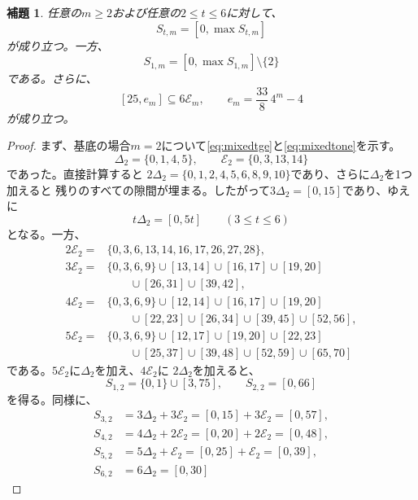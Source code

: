 \documentclass[12pt]{ltjsarticle}
\theoremstyle{plain}
\newtheorem{lemma}[theorem]{補題}
\begin{document}
\begin{lemma}\label{lem:mixed}
任意の$m\geq2$および任意の$2\leq t\leq6$に対して、
\begin{equation}\label{eq:mixedtge}
 S_{t,m}=[0,\max S_{t,m}]
\end{equation}
が成り立つ。一方、
\begin{equation}\label{eq:mixedtone}
 S_{1,m}=[0,\max S_{1,m}]\setminus\{2\}
\end{equation}
である。さらに、
\begin{equation}\label{eq:mixedEminterval}
 [25,e_m]\subseteq6\mathcal E_m,\qquad e_m=\frac{33}{8}\,4^m-4
\end{equation}
が成り立つ。
\end{lemma}

\begin{proof}
まず、基底の場合$m=2$について\eqref{eq:mixedtge}と\eqref{eq:mixedtone}を示す。
\[
 \Delta_2=\{0,1,4,5\},\qquad \mathcal E_2=\{0,3,13,14\}
\]
であった。直接計算すると
$2\Delta_2=\{0,1,2,4,5,6,8,9,10\}$であり、さらに$\Delta_2$を1つ加えると
残りのすべての隙間が埋まる。したがって$3\Delta_2=[0,15]$であり、ゆえに
\[
 t\Delta_2=[0,5t]\qquad(3\leq t\leq6)
\]
となる。一方、
\[
\begin{aligned}
2\mathcal E_2
={}&\{0,3,6,13,14,16,17,26,27,28\},\\[1ex]
3\mathcal E_2
={}&\{0,3,6,9\}\cup[13,14]\cup[16,17]\cup[19,20]\\
&\qquad\cup[26,31]\cup[39,42],\\[1ex]
4\mathcal E_2
={}&\{0,3,6,9\}\cup[12,14]\cup[16,17]\cup[19,20]\\
&\qquad\cup[22,23]\cup[26,34]\cup[39,45]\cup[52,56],\\[1ex]
5\mathcal E_2
={}&\{0,3,6,9\}\cup[12,17]\cup[19,20]\cup[22,23]\\
&\qquad\cup[25,37]\cup[39,48]\cup[52,59]\cup[65,70]
\end{aligned}
\]
である。$5\mathcal E_2$に$\Delta_2$を加え、$4\mathcal E_2$に
$2\Delta_2$を加えると、
\[
 S_{1,2}=\{0,1\}\cup[3,75],\qquad S_{2,2}=[0,66]
\]
を得る。同様に、
\[
\begin{aligned}
S_{3,2}&=3\Delta_2+3\mathcal E_2=[0,15]+3\mathcal E_2=[0,57],\\[1ex]
S_{4,2}&=4\Delta_2+2\mathcal E_2=[0,20]+2\mathcal E_2=[0,48],\\[1ex]
S_{5,2}&=5\Delta_2+\mathcal E_2 =[0,25]+\mathcal E_2 =[0,39],\\[1ex]
S_{6,2}&=6\Delta_2=[0,30]
\end{aligned}
\]

\end{proof}
\end{document}
